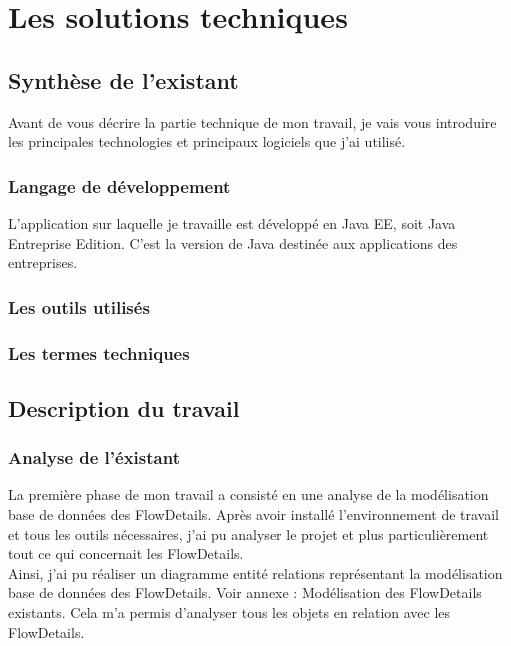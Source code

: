 \chapter{Les solutions techniques}

\section{Synthèse de l'existant}
Avant de vous décrire la partie technique de mon travail, je vais vous introduire les principales technologies et principaux logiciels que j'ai utilisé. \\

\subsection{Langage de développement}
L'application sur laquelle je travaille est développé en Java EE, soit Java Entreprise Edition. C'est la version de Java destinée aux applications des entreprises. 

\subsection{Les outils utilisés}

\subsection{Les termes techniques}

\section{Description du travail}

\subsection{Analyse de l'éxistant}
La première phase de mon travail a consisté en une analyse de la modélisation base de données des FlowDetails. Après avoir installé l'environnement de travail et tous les outils nécessaires, j'ai pu analyser le projet et plus particulièrement tout ce qui concernait les FlowDetails. \\

Ainsi, j'ai pu réaliser un diagramme entité relations représentant la modélisation base de données des FlowDetails. Voir annexe : Modélisation des FlowDetails existants. Cela m'a permis d'analyser tous les objets en relation avec les FlowDetails.  


